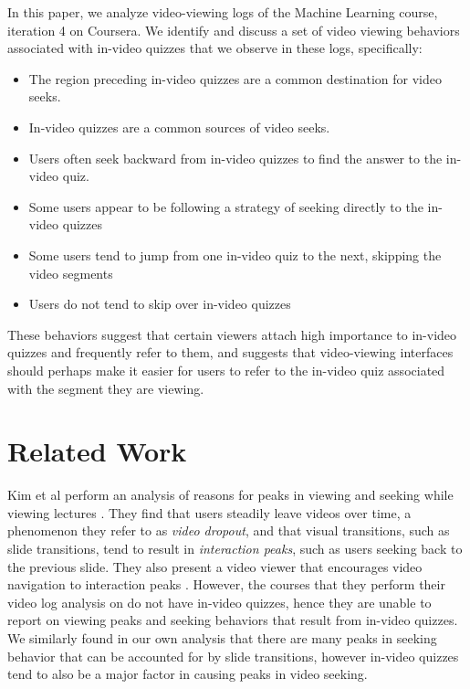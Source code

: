 \documentclass{sigchi}
\begin{document}
In this paper, we analyze video-viewing logs of the Machine Learning course, iteration 4 on Coursera. We identify and discuss a set of video viewing behaviors associated with in-video quizzes that we observe in these logs, specifically:

\begin{itemize}
\item The region preceding in-video quizzes are a common destination for video seeks.
\item In-video quizzes are a common sources of video seeks.
\item Users often seek backward from in-video quizzes to find the answer to the in-video quiz.
\item Some users appear to be following a strategy of seeking directly to the in-video quizzes
\item Some users tend to jump from one in-video quiz to the next, skipping the video segments
\item Users do not tend to skip over in-video quizzes
\end{itemize}

These behaviors suggest that certain viewers attach high importance to in-video quizzes and frequently refer to them, and suggests that video-viewing interfaces should perhaps make it easier for users to refer to the in-video quiz associated with the segment they are viewing.

\newpage

\section{Related Work}

Kim et al perform an analysis of reasons for peaks in viewing and seeking while viewing lectures \cite{juho}. They find that users steadily leave videos over time, a phenomenon they refer to as \emph{video dropout}, and that visual transitions, such as slide transitions, tend to result in \emph{interaction peaks}, such as users seeking back to the previous slide. They also present a video viewer that encourages video navigation to interaction peaks  \cite{juho2}. However, the courses that they perform their video log analysis on do not have in-video quizzes, hence they are unable to report on viewing peaks and seeking behaviors that result from in-video quizzes. We similarly found in our own analysis that there are many peaks in seeking behavior that can be accounted for by slide transitions, however in-video quizzes tend to also be a major factor in causing peaks in video seeking.
\end{document}
